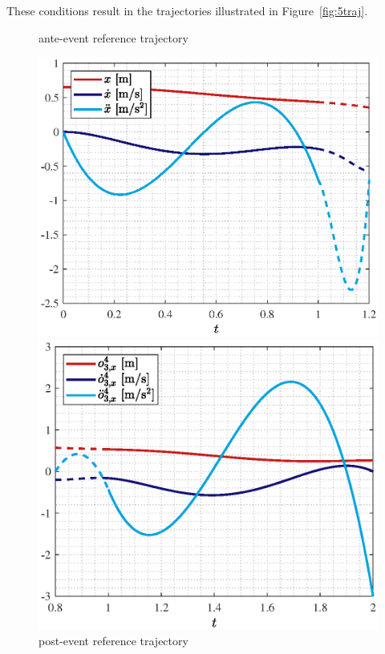 \documentclass[../DC2019003Bouma.tex]{subfiles}
\begin{document}
These conditions result in the trajectories illustrated in Figure~\ref{fig:5traj}.
\begin{figure}[bt!]
\begin{minipage}[c]{.5\textwidth}
\centering
\caption*{ante-event reference trajectory}
\includegraphics[width=\textwidth]{xtraj01.eps}
\end{minipage}
\begin{minipage}[c]{.5\textwidth}
\centering
\caption*{post-event reference trajectory}
\includegraphics[width=\textwidth]{o3xtraj12.eps}
\end{minipage}


\end{figure}
\end{document}
